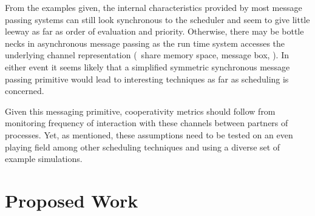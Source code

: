 From the examples given, the internal characteristics provided by most message passing systems can still look 
synchronous to the scheduler and seem to give little leeway as far as order of evaluation and priority. Otherwise,
there may be bottle necks in asynchronous message passing as the run time system accesses the underlying channel
representation (\eg~share memory space, message box, \etc). In either event it seems likely that a simplified 
symmetric synchronous message passing primitive would lead to interesting techniques as far as scheduling is 
concerned.

Given this messaging primitive, cooperativity metrics should follow from monitoring frequency of interaction 
with these channels between partners of processes. Yet, as mentioned, these assumptions need to be tested on an 
even playing field among other scheduling techniques and using a diverse set of example simulations.


\section{Proposed Work} %



